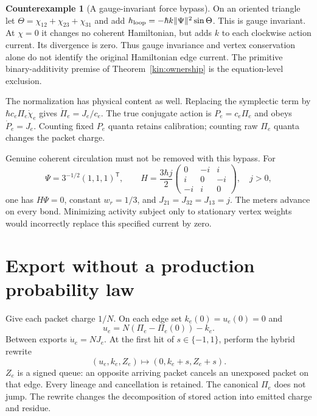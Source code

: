 \documentclass[11pt,oneside,openany]{book}
\theoremstyle{definition}
\newtheorem{counterexample}[theorem]{Counterexample}
\theoremstyle{remark}\newtheorem{remark}[theorem]{Remark}
\begin{document}
\begin{counterexample}[A gauge-invariant force bypass]\label{kin:loop}
On an oriented triangle let
$\Theta=\chi_{12}+\chi_{23}+\chi_{31}$ and add
$h_{\rm loop}=-\hbar k\|\Psi\|^2\sin\Theta$.
This is gauge invariant. At $\chi=0$ it changes no coherent Hamiltonian,
but adds $k$ to each clockwise action current. Its divergence is zero.
Thus gauge invariance and vertex conservation alone do not identify the
original Hamiltonian edge current. The primitive binary-additivity premise
of Theorem~\ref{kin:ownership} is the equation-level exclusion.
\end{counterexample}

The normalization has physical content as well. Replacing the symplectic
term by $\hbar c_e\Pi_e\dot\chi_e$ gives $\dot\Pi_e=J_e/c_e$.
The true conjugate action is $P_e=c_e\Pi_e$ and obeys $\dot P_e=J_e$.
Counting fixed $P_e$ quanta retains calibration; counting raw $\Pi_e$
quanta changes the packet charge.

Genuine coherent circulation must not be removed with this bypass. For
\[
 \Psi=3^{-1/2}(1,1,1)^{\mathsf T},\qquad
 H=\frac{3\hbar j}{2}
 \begin{pmatrix}0&-i&i\\i&0&-i\\-i&i&0\end{pmatrix},\quad j>0,
\]
one has $H\Psi=0$, constant $w_r=1/3$, and
$J_{21}=J_{32}=J_{13}=j$. The meters advance on every bond. Minimizing
activity subject only to stationary vertex weights would incorrectly
replace this specified current by zero.

\section{Export without a production probability law}
Give each packet charge $1/N$. On each edge set $k_e(0)=u_e(0)=0$ and
\[
 u_e=N(\Pi_e-\Pi_e(0))-k_e.
\]
Between exports $\dot u_e=NJ_e$. At the first hit of $s\in\{-1,1\}$,
perform the hybrid rewrite
\begin{equation}
 (u_e,k_e,Z_e)\longmapsto(0,k_e+s,Z_e+s).
 \label{kin:exportrewrite}
\end{equation}
$Z_e$ is a signed queue: an opposite arriving packet cancels an unexposed
packet on that edge. Every lineage and cancellation is retained. The
canonical $\Pi_e$ does not jump. The rewrite changes the decomposition of
stored action into emitted charge and residue.
\end{document}
